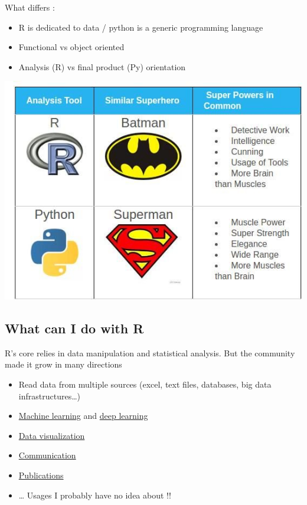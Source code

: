 \documentclass[
]{book}
\providecommand{\tightlist}{%
  \setlength{\itemsep}{0pt}\setlength{\parskip}{0pt}}
\begin{document}
What differs :

\begin{itemize}
\tightlist
\item
  R is dedicated to data / python is a generic programming language
\item
  Functional vs object oriented
\item
  Analysis (R) vs final product (Py) orientation
\end{itemize}

\includegraphics{img/R-python.jpg}

\hypertarget{what-can-i-do-with-r}{%
\subsection{What can I do with R}\label{what-can-i-do-with-r}}

R's core relies in data manipulation and statistical analysis. But the community made it grow in many directions

\begin{itemize}
\tightlist
\item
  Read data from multiple sources (excel, text files, databases, big data infrastructures\ldots)
\item
  \href{https://rviews.rstudio.com/2019/06/19/a-gentle-intro-to-tidymodels/}{Machine learning} and \href{https://keras.rstudio.com/}{deep learning}
\item
  \href{https://www.r-graph-gallery.com/}{Data visualization}
\item
  \href{https://shiny.rstudio.com/gallery/}{Communication}
\item
  \href{https://bookdown.org/home/}{Publications}
\item
  \ldots{} Usages I probably have no idea about !!
\end{itemize}
\end{document}
